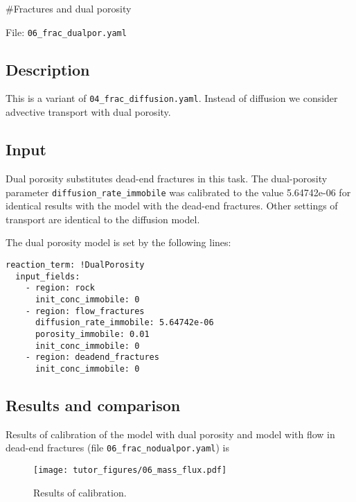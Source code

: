\#Fractures and dual porosity

File: \texttt{06\_frac\_dualpor.yaml}

\subsection{Description}

This is a variant of \texttt{04\_frac\_diffusion.yaml}. Instead of
diffusion we consider advective transport with dual porosity.

\subsection{Input}

Dual porosity substitutes dead-end fractures in this task. The
dual-porosity parameter \texttt{diffusion\_rate\_immobile} was
calibrated to the value 5.64742e-06 for identical results with the model
with the dead-end fractures. Other settings of transport are identical
to the diffusion model.

The dual porosity model is set by the following lines:

\begin{verbatim}
reaction_term: !DualPorosity
  input_fields:
    - region: rock
      init_conc_immobile: 0
    - region: flow_fractures
      diffusion_rate_immobile: 5.64742e-06
      porosity_immobile: 0.01
      init_conc_immobile: 0
    - region: deadend_fractures
      init_conc_immobile: 0
\end{verbatim}

\subsection{Results and comparison}

Results of calibration of the model with dual porosity and model with
flow in dead-end fractures (file \texttt{06\_frac\_nodualpor.yaml}) is

\begin{figure}
\hypertarget{fig:calib}{%
\centering
\texttt{[image: tutor\_figures/06\_mass\_flux.pdf]}
\caption{Results of calibration.}\label{fig:calib}
}
\end{figure}
